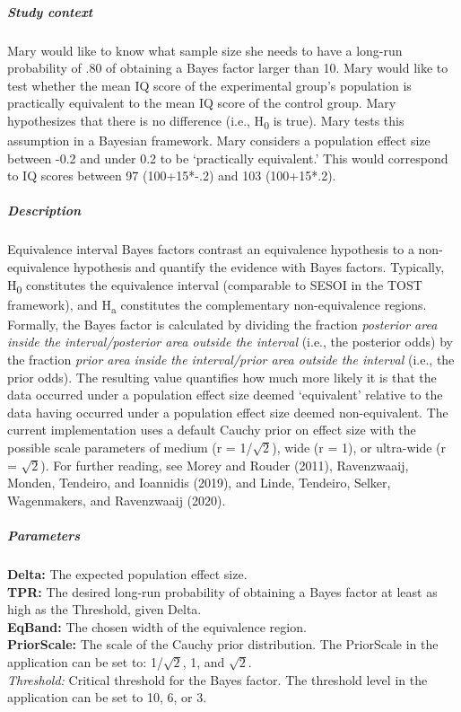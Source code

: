 \documentclass[
  english,
  man,floatsintext]{apa6}
\let\oldsubparagraph\subparagraph
\renewcommand{\subparagraph}[1]{\oldsubparagraph{#1}\mbox{}}
\begin{document}
\hypertarget{study-context-1}{%
\subparagraph{Study context}\label{study-context-1}}

Mary would like to know what sample size she needs to have a long-run probability of .80 of obtaining a Bayes factor larger than 10. Mary would like to test whether the mean IQ score of the experimental group's population is practically equivalent to the mean IQ score of the control group. Mary hypothesizes that there is no difference (i.e., H\textsubscript{0} is true). Mary tests this assumption in a Bayesian framework. Mary considers a population effect size between -0.2 and under 0.2 to be `practically equivalent.' This would correspond to IQ scores between 97 (100+15*-.2) and 103 (100+15*.2).

\hypertarget{description-1}{%
\subparagraph{Description}\label{description-1}}

Equivalence interval Bayes factors contrast an equivalence hypothesis to a non-equivalence hypothesis and quantify the evidence with Bayes factors. Typically, H\textsubscript{0} constitutes the equivalence interval (comparable to SESOI in the TOST framework), and H\textsubscript{a} constitutes the complementary non-equivalence regions. Formally, the Bayes factor is calculated by dividing the fraction \emph{posterior area inside the interval/posterior area outside the interval} (i.e., the posterior odds) by the fraction \emph{prior area inside the interval/prior area outside the interval} (i.e., the prior odds). The resulting value quantifies how much more likely it is that the data occurred under a population effect size deemed `equivalent' relative to the data having occurred under a population effect size deemed non-equivalent. The current implementation uses a default Cauchy prior on effect size with the possible scale parameters of medium (r = 1/\(\sqrt{2}\)), wide (r = 1), or ultra-wide (r = \(\sqrt{2}\)). For further reading, see Morey and Rouder (2011), Ravenzwaaij, Monden, Tendeiro, and Ioannidis (2019), and Linde, Tendeiro, Selker, Wagenmakers, and Ravenzwaaij (2020).

\hypertarget{parameters-1}{%
\subparagraph{Parameters}\label{parameters-1}}

\textbf{Delta:} The expected population effect size.\\
\textbf{TPR:} The desired long-run probability of obtaining a Bayes factor at least as high as the Threshold, given Delta.\\
\textbf{EqBand:} The chosen width of the equivalence region.\\
\textbf{PriorScale:} The scale of the Cauchy prior distribution. The PriorScale in the application can be set to: 1/\(\sqrt{2}\), 1, and \(\sqrt{2}\).\\
\emph{Threshold:} Critical threshold for the Bayes factor. The threshold level in the application can be set to 10, 6, or 3.\\
\end{document}
